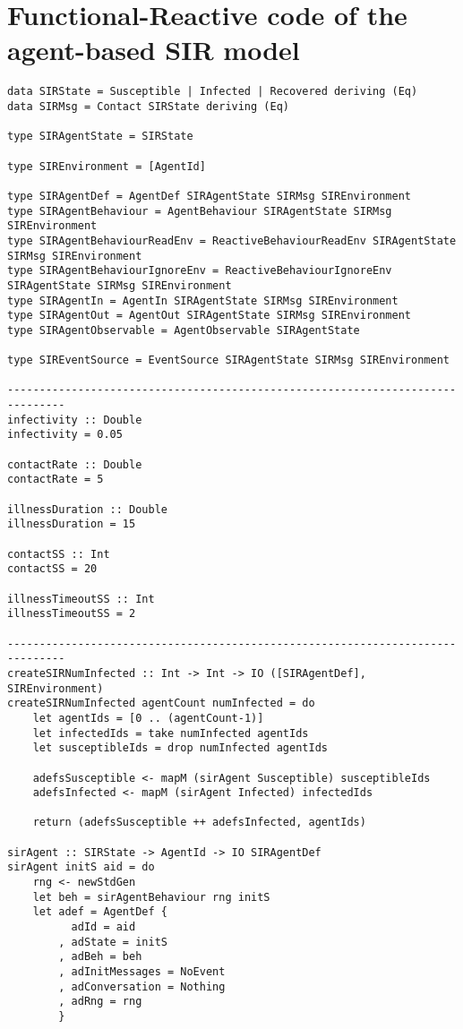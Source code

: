 \section{Functional-Reactive code of the agent-based SIR model}
\label{app:abs_code}

\begin{verbatim}
data SIRState = Susceptible | Infected | Recovered deriving (Eq)
data SIRMsg = Contact SIRState deriving (Eq)

type SIRAgentState = SIRState

type SIREnvironment = [AgentId]

type SIRAgentDef = AgentDef SIRAgentState SIRMsg SIREnvironment
type SIRAgentBehaviour = AgentBehaviour SIRAgentState SIRMsg SIREnvironment
type SIRAgentBehaviourReadEnv = ReactiveBehaviourReadEnv SIRAgentState SIRMsg SIREnvironment
type SIRAgentBehaviourIgnoreEnv = ReactiveBehaviourIgnoreEnv SIRAgentState SIRMsg SIREnvironment
type SIRAgentIn = AgentIn SIRAgentState SIRMsg SIREnvironment
type SIRAgentOut = AgentOut SIRAgentState SIRMsg SIREnvironment
type SIRAgentObservable = AgentObservable SIRAgentState

type SIREventSource = EventSource SIRAgentState SIRMsg SIREnvironment

-------------------------------------------------------------------------------
infectivity :: Double
infectivity = 0.05

contactRate :: Double
contactRate = 5

illnessDuration :: Double
illnessDuration = 15

contactSS :: Int
contactSS = 20

illnessTimeoutSS :: Int
illnessTimeoutSS = 2

-------------------------------------------------------------------------------
createSIRNumInfected :: Int -> Int -> IO ([SIRAgentDef], SIREnvironment)
createSIRNumInfected agentCount numInfected = do
    let agentIds = [0 .. (agentCount-1)]
    let infectedIds = take numInfected agentIds
    let susceptibleIds = drop numInfected agentIds

    adefsSusceptible <- mapM (sirAgent Susceptible) susceptibleIds
    adefsInfected <- mapM (sirAgent Infected) infectedIds

    return (adefsSusceptible ++ adefsInfected, agentIds)

sirAgent :: SIRState -> AgentId -> IO SIRAgentDef
sirAgent initS aid = do
    rng <- newStdGen
    let beh = sirAgentBehaviour rng initS
    let adef = AgentDef { 
          adId = aid
        , adState = initS
        , adBeh = beh
        , adInitMessages = NoEvent
        , adConversation = Nothing
        , adRng = rng 
        }


\end{verbatim}
